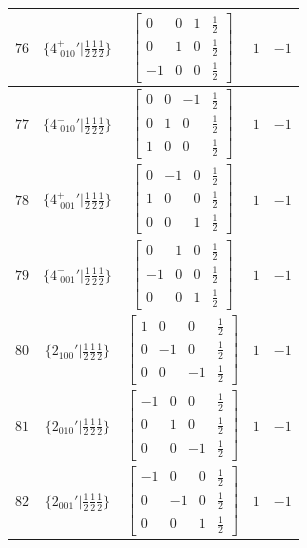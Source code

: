 \documentclass[fleqn,8pt]{jsarticle}
\begin{document}
\begin{longtable}{ccccc}
$ 76 $ & $ \{4^{+}_{\,\,010}{}'|\frac{1}{2} \frac{1}{2} \frac{1}{2}\} $ & $ \begin{bmatrix} 0 & 0 & 1 & \frac{1}{2} \\ 0 & 1 & 0 & \frac{1}{2} \\ -1 & 0 & 0 & \frac{1}{2} \end{bmatrix} $ & $ 1 $ & $ -1 $ \\ \hline
$ 77 $ & $ \{4^{-}_{\,\,010}{}'|\frac{1}{2} \frac{1}{2} \frac{1}{2}\} $ & $ \begin{bmatrix} 0 & 0 & -1 & \frac{1}{2} \\ 0 & 1 & 0 & \frac{1}{2} \\ 1 & 0 & 0 & \frac{1}{2} \end{bmatrix} $ & $ 1 $ & $ -1 $ \\ \hline
$ 78 $ & $ \{4^{+}_{\,\,001}{}'|\frac{1}{2} \frac{1}{2} \frac{1}{2}\} $ & $ \begin{bmatrix} 0 & -1 & 0 & \frac{1}{2} \\ 1 & 0 & 0 & \frac{1}{2} \\ 0 & 0 & 1 & \frac{1}{2} \end{bmatrix} $ & $ 1 $ & $ -1 $ \\ \hline
$ 79 $ & $ \{4^{-}_{\,\,001}{}'|\frac{1}{2} \frac{1}{2} \frac{1}{2}\} $ & $ \begin{bmatrix} 0 & 1 & 0 & \frac{1}{2} \\ -1 & 0 & 0 & \frac{1}{2} \\ 0 & 0 & 1 & \frac{1}{2} \end{bmatrix} $ & $ 1 $ & $ -1 $ \\ \hline
$ 80 $ & $ \{2{}_{100}{}'|\frac{1}{2} \frac{1}{2} \frac{1}{2}\} $ & $ \begin{bmatrix} 1 & 0 & 0 & \frac{1}{2} \\ 0 & -1 & 0 & \frac{1}{2} \\ 0 & 0 & -1 & \frac{1}{2} \end{bmatrix} $ & $ 1 $ & $ -1 $ \\ \hline
$ 81 $ & $ \{2{}_{010}{}'|\frac{1}{2} \frac{1}{2} \frac{1}{2}\} $ & $ \begin{bmatrix} -1 & 0 & 0 & \frac{1}{2} \\ 0 & 1 & 0 & \frac{1}{2} \\ 0 & 0 & -1 & \frac{1}{2} \end{bmatrix} $ & $ 1 $ & $ -1 $ \\ \hline
$ 82 $ & $ \{2{}_{001}{}'|\frac{1}{2} \frac{1}{2} \frac{1}{2}\} $ & $ \begin{bmatrix} -1 & 0 & 0 & \frac{1}{2} \\ 0 & -1 & 0 & \frac{1}{2} \\ 0 & 0 & 1 & \frac{1}{2} \end{bmatrix} $ & $ 1 $ & $ -1 $ \\ \hline

\end{longtable}
\end{document}
